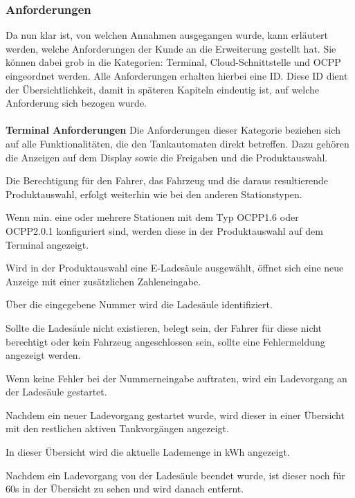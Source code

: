 \subsubsection{Anforderungen}
Da nun klar ist, von welchen Annahmen ausgegangen wurde, kann erläutert werden, welche Anforderungen der Kunde an die Erweiterung gestellt hat. Sie können dabei grob in die Kategorien: Terminal, Cloud-Schnittstelle und OCPP eingeordnet werden. Alle Anforderungen erhalten hierbei eine \acs{ID}. Diese ID dient der Übersichtlichkeit, damit in späteren Kapiteln eindeutig ist, auf welche Anforderung sich bezogen wurde.\\ \\
\noindent\textbf{Terminal Anforderungen}\newline
\noindent Die Anforderungen dieser Kategorie beziehen sich auf alle Funktionalitäten, die den Tankautomaten direkt betreffen. Dazu gehören die Anzeigen auf dem Display sowie die Freigaben und die Produktauswahl.
\begin{description}[leftmargin=34pt]
	\item[\textbf{T-01}] Die Berechtigung für den Fahrer, das Fahrzeug und die daraus resultierende Produktauswahl, erfolgt weiterhin wie bei den anderen Stationstypen.
	\item[\textbf{T-02}] Wenn min. eine oder mehrere Stationen mit dem Typ \glqq{}OCPP1.6\grqq{} oder \\
	\glqq{}OCPP2.0.1\grqq{} konfiguriert sind, werden diese in der Produktauswahl auf dem Terminal angezeigt.
	\item[\textbf{T-03}] Wird in der Produktauswahl eine E-Ladesäule ausgewählt, öffnet sich eine neue Anzeige mit einer zusätzlichen Zahleneingabe.
	\item[\textbf{T-04}] Über die eingegebene Nummer wird die Ladesäule identifiziert.
	\item[\textbf{T-05}] Sollte die Ladesäule nicht existieren, belegt sein, der Fahrer für diese nicht berechtigt oder kein Fahrzeug angeschlossen sein, sollte eine Fehlermeldung angezeigt werden.
	\item[\textbf{T-06}] Wenn keine Fehler bei der Nummerneingabe auftraten, wird ein Ladevorgang an der Ladesäule gestartet.
	\item[\textbf{T-07}] Nachdem ein neuer Ladevorgang gestartet wurde, wird dieser in einer Übersicht mit den restlichen aktiven Tankvorgängen angezeigt.
	\item[\textbf{T-08}] In dieser Übersicht wird die aktuelle Lademenge in kWh angezeigt.
	\item[\textbf{T-09}] Nachdem ein Ladevorgang von der Ladesäule beendet wurde, ist dieser noch für 60s in der Übersicht zu sehen und wird danach entfernt.
\end{description}

